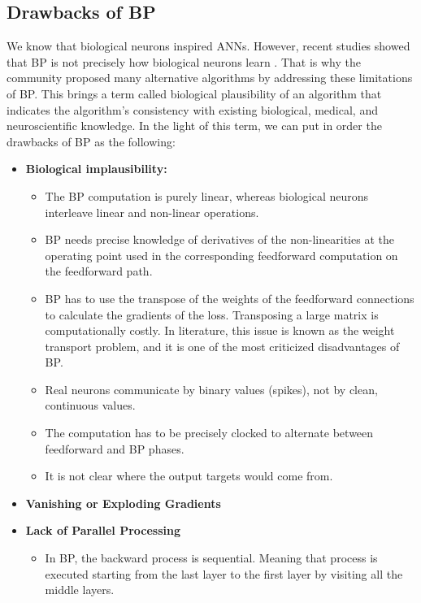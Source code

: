 \documentclass[a4paper, nobind]{templates/ociamthesis}
\begin{document}
\hypertarget{drawbacks-of-bp}{%
\subsection{Drawbacks of BP}\label{drawbacks-of-bp}}

We know that biological neurons inspired ANNs. However, recent studies showed that BP is not precisely how biological neurons learn \cite{bengio2016biologically}. That is why the community proposed many alternative algorithms by addressing these limitations of BP. This brings a term called biological plausibility of an algorithm that indicates the algorithm's consistency with existing biological, medical, and neuroscientific knowledge. In the light of this term, we can put in order the drawbacks of BP as the following:

\begin{itemize}
    \item \textbf{Biological implausibility:}
    \begin{itemize}
        \item The BP computation is purely linear, whereas biological neurons interleave linear and non-linear operations.
        \item BP needs precise knowledge of derivatives of the non-linearities at the operating point used in the corresponding feedforward computation on the feedforward path.
        \item BP has to use the transpose of the weights of the feedforward connections to calculate the gradients of the loss. Transposing a large matrix is computationally costly. In literature, this issue is known as the weight transport problem, and it is one of the most criticized disadvantages of BP.
        \item Real neurons communicate by binary values (spikes), not by clean, continuous values.
        \item The computation has to be precisely clocked to alternate between feedforward and BP phases.
        \item It is not clear where the output targets would come from.
        \cite{bengio2016biologically, lee2015difference} 
    \end{itemize}  
    \item \textbf{Vanishing or Exploding Gradients}
    \item \textbf{Lack of Parallel Processing} \cite{ma2019hsic}
      \begin{itemize}
        \item In BP, the backward process is sequential. Meaning that process is executed starting from the last layer to the first layer by visiting all the middle layers.
      \end{itemize}
\end{itemize}
\end{document}
